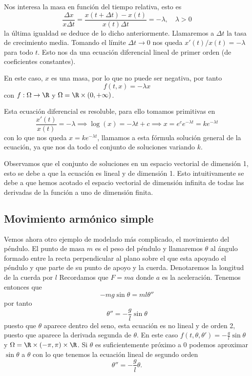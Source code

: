 \documentclass[../main.tex]{subfiles}
\begin{document}
Nos interesa la masa en función del tiempo relativa, esto es
\[\frac{\Delta x}{x \Delta t} = \frac{x(t + \Delta t) - x(t)}{x(t) \Delta t}
	= -\lambda, \quad \lambda > 0\]
la última igualdad se deduce de lo dicho anteriormente. Llamaremos a 
\(\Delta t\) la tasa de crecimiento media. Tomando el límite \(\Delta t \to 0\)
nos queda \(x'(t)/x(t) = -\lambda\) para todo \(t\). Esto nos da una ecuación
diferencial lineal de primer orden (de coeficientes constantes).

En este caso, \(x\) es una masa, por lo que no puede ser negativa, por tanto
\[f(t, x) = -\lambda x\] con \(f : \Omega \to \R\) y \(\Omega = \R \times
(0, +\infty)\).

Esta ecuación diferencial es resoluble, para ello tomamos primitivas en
\[\frac{x'(t)}{x(t)} = -\lambda \implies \log(x) = -\lambda t + c
	\implies x = e^c e^{-\lambda t} = k e^{-\lambda t}\]
con lo que nos queda \(x = k e^{-\lambda t}\), llamamos a esta fórmula solución
general de la ecuación, ya que nos da todo el conjunto de soluciones variando
\(k\).

Observamos que el conjunto de soluciones en un espacio vectorial de dimensión 1,
esto se debe a que la ecuación es lineal y de dimensión 1. Esto intuitivamente
se debe a que hemos acotado el espacio vectorial de dimensión infinita de todas
las derivadas de la función a uno de dimensión finita.

\subsection{Movimiento armónico simple}

Vemos ahora otro ejemplo de modelado más complicado, el movimiento del péndulo.
El punto de masa \(m\) es el peso del péndulo y llamaremos \(\theta\) al ángulo
formado entre la recta perpendicular al plano sobre el que esta apoyado el
péndulo y que parte de su punto de apoyo y la cuerda. Denotaremos la longitud
de la cuerda por \(l\) Recordamos que \(F = ma\) donde \(a\) es la aceleración. 
Tenemos entonces que
\[-m g \sin\theta = m l \theta''\]
por tanto
\[\theta'' = -\frac{g}{l} \sin\theta\]
puesto que \(\theta\) aparece dentro del seno, esta ecuación es no lineal y de
orden 2, puesto que aparece la derivada segunda de \(\theta\). En este caso 
\(f(t, \theta, \theta') = -\frac{g}{l} \sin\theta\) y \(\Omega = \R \times
(-\pi, \pi) \times \R\). Si \(\theta\) es suficientemente próximo a \(0\)
podemos aproximar \(\sin\theta\) a \(\theta\) con lo que tenemos la ecuación
lineal de segundo orden
\[\theta'' = -\frac{g}{l}\theta.\]
\end{document}
